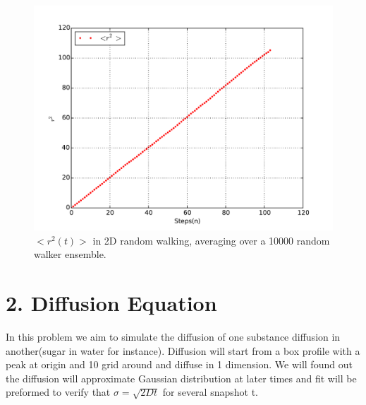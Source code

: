 \documentclass[aps,prl,preprint,superscriptaddress]{revtex4}
\begin{document}
		\begin{figure}[H]
			\centering
			\includegraphics[width=1.0\textwidth]{rwxn2.pdf}
			\caption{$<r^2(t)>$ in 2D random walking, averaging over a 10000 random walker ensemble.}
		\end{figure}

	
	\section{2. Diffusion Equation}
	In this problem we aim to simulate the diffusion of one substance diffusion in another(sugar in water for instance). Diffusion will start from a box profile with a peak at origin and 10 grid around and diffuse in 1 dimension. We will found out the diffusion will approximate Gaussian distribution at later times and fit will be preformed to verify that $\sigma=\sqrt{2Dt}$ for several snapshot t.
\end{document}
